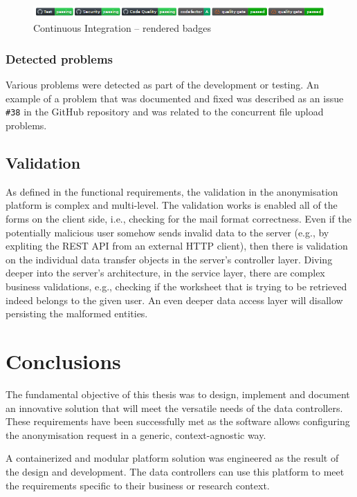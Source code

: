 \documentclass[a4paper,twoside,12pt]{book}
\begin{document}
\begin{figure}
  \centering
  \includegraphics[width=\linewidth]{img/ci_badges.png}
  \caption{Continuous Integration – rendered badges}
  \label{fig:ci_badges}
\end{figure}

\subsection{Detected problems}
Various problems were detected as part of the development or testing. An example of a problem that was documented and fixed was described as an issue \verb|#38| in the GitHub repository and was related to the concurrent file upload problems.

\section{Validation}

As defined in the functional requirements, the validation in the anonymisation platform is complex and multi-level. The validation works is enabled all of the forms on the client side, i.e., checking for the mail format correctness. Even if the potentially malicious user somehow sends invalid data to the server (e.g., by expliting the REST API from an external HTTP client), then there is validation on the individual data transfer objects in the server's controller layer. Diving deeper into the server's architecture, in the service layer, there are complex business validations, e.g., checking if the worksheet that is trying to be retrieved indeed belongs to the given user. An even deeper data access layer will disallow persisting the malformed entities.

\chapter{Conclusions}

The fundamental objective of this thesis was to design, implement and document an innovative solution that will meet the versatile needs of the data controllers. These requirements have been successfully met as the software allows configuring the anonymisation request in a generic, context-agnostic way. 

A containerized and modular platform solution was engineered as the result of the design and development. The data controllers can use this platform to meet the requirements specific to their business or research context.
\end{document}
